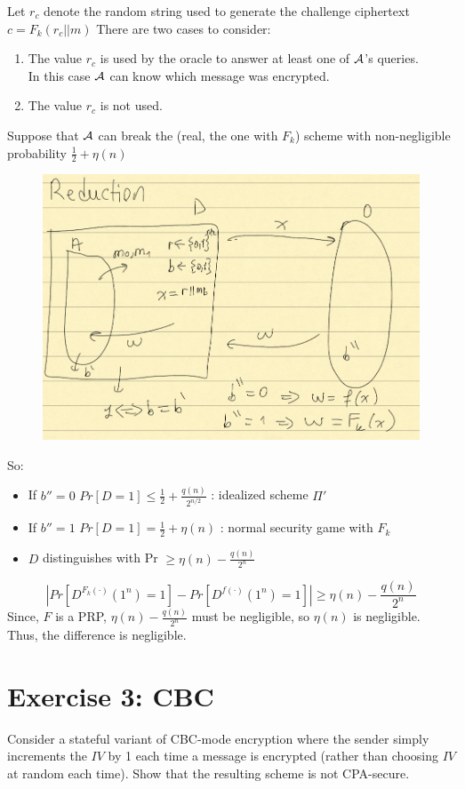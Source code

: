 \documentclass[12pt]{article}
\begin{document}
Let $r_c$ denote the random string used to generate the challenge ciphertext $c = F_k(r_c||m)$ There are two cases to consider:
\begin{enumerate}
\item The value $r_c$ is used by the oracle to answer at least one of $\mathcal{A}$'s queries.\\
In this case $\mathcal{A}$ can know which message was encrypted.
\item The value $r_c$ is not used.
\end{enumerate}

Suppose that $\mathcal{A}$ can break the (real, the one with $F_k$) scheme with non-negligible probability $\frac12 + \eta(n)$
\begin{figure}[ht]
    \centering
    \includegraphics[width=12cm]{figures/f1.png}
\end{figure}

So:
\begin{itemize}
\item If $b''=0$ $Pr[D=1] \le \frac12 + \frac{q(n)}{2^{n/2}}$ : idealized scheme $\Pi'$
\item If $b''=1$ $Pr[D=1] = \frac12 + \eta(n)$ : normal security game with $F_k$
\item $D$ distinguishes with Pr $\ge \eta(n)-\frac{q(n)}{2^n}$
\end{itemize}
\begin{equation*}
|Pr[D^{F_k(\cdot)}(1^n)=1]-Pr[D^{f(\cdot)}(1^n)=1]| \ge \eta(n)-\frac{q(n)}{2^n}
\end{equation*}
Since, $F$ is a PRP, $\eta(n)-\frac{q(n)}{2^n}$ must be negligible, so $\eta(n)$ is negligible. Thus, the difference is negligible.

\section{Exercise 3: CBC}
Consider a stateful variant of CBC-mode encryption where the sender simply increments the $IV$ by 1 each time a message is encrypted (rather than choosing $IV$ at random each time). Show that the resulting scheme is not CPA-secure.
\end{document}
